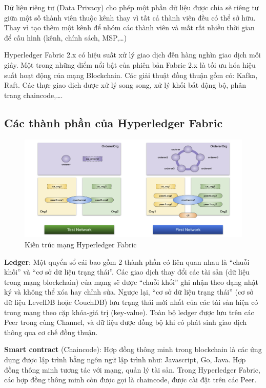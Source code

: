 Dữ liệu riêng tư (Data Privacy) cho phép một phần dữ liệu được chia sẽ riêng tư giữa một số thành viên thuộc kênh thay vì tất cả thành viên đều có thể sở hữu. Thay vì tạo thêm một kênh để nhóm các thành viên và mất rất nhiều thời gian để cấu hình (kênh, chính sách, MSP,…) 

Hyperledger Fabric 2.x có hiệu suất xử lý giao dịch đến hàng nghìn giao dịch mỗi giây. Một trong những điểm nổi bật của phiên bản Fabric 2.x là tối ưu hóa hiệu suất hoạt động của mạng Blockchain. Các giải thuật đồng thuận gồm có: Kafka, Raft. Các thực giao dịch được xử lý song song, xử lý khối bất động bộ, phân trang chaincode,\ldots.

\subsection{Các thành phần của Hyperledger Fabric}

\begin{figure}[htbp]
\centering
\includegraphics[width=.9\linewidth]{img/hlf_network.png}
\caption{Kiến trúc mạng Hyperledger Fabric}
\label{fig:hlf_network}
\end{figure}

\textbf{Ledger}: Một quyển sổ cái bao gồm 2 thành phần có liên quan nhau là “chuỗi khối” và “cơ sở dữ liệu trạng thái”. Các giao dịch thay đổi các tài sản (dữ liệu trong mạng blockchain) của mạng sẽ được “chuỗi khối” ghi nhận theo dạng nhật ký và không thể xóa hay chỉnh sửa. Ngược lại, “cơ sở dữ liệu trạng thái” (cơ sở dữ liệu LevelDB hoặc CouchDB) lưu trạng thái mới nhất của các tài sản hiện có trong mạng theo cặp khóa-giá trị (key-value). Toàn bộ ledger được lưu trên các Peer trong cùng Channel, và dữ liệu được đồng bộ khi có phát sinh giao dịch thông qua cơ chế đồng thuận.

\textbf{Smart contract} (Chaincode): Hợp đồng thông minh trong blockchain là các ứng dụng được lập trình bằng ngôn ngữ lập trình như: Javascript, Go, Java. Hợp đồng thông minh tương tác với mạng, quản lý tài sản. Trong Hyperledger Fabric, các hợp đồng thông minh còn được gọi là chaincode, được cài đặt trên các Peer.

